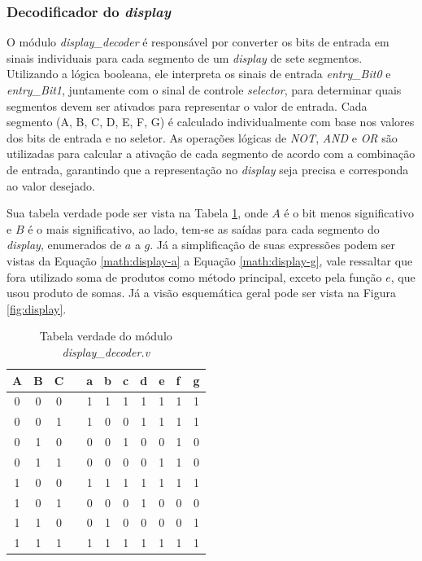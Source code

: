 \documentclass[
	article,			%
	11pt,				%
	oneside,			%
	a4paper,			%
	english,			%
	brazil,				%
	sumario=tradicional
	]{abntex2}
\begin{document}
\subsubsection{Decodificador do \textit{display}}
O módulo \textit{display\_decoder} é responsável por converter os bits de entrada em sinais individuais para cada segmento de um \textit{display} de sete segmentos. Utilizando a lógica booleana, ele interpreta os sinais de entrada \textit{entry\_Bit0} e \textit{entry\_Bit1}, juntamente com o sinal de controle \textit{selector}, para determinar quais segmentos devem ser ativados para representar o valor de entrada. Cada segmento (A, B, C, D, E, F, G) é calculado individualmente com base nos valores dos bits de entrada e no seletor. As operações lógicas de \textit{NOT}, \textit{AND} e \textit{OR} são utilizadas para calcular a ativação de cada segmento de acordo com a combinação de entrada, garantindo que a representação no \textit{display} seja precisa e corresponda ao valor desejado. 

Sua tabela verdade pode ser vista na Tabela \ref{tab:display-decoder}, onde $A$ é o bit menos significativo e $B$ é o mais significativo, ao lado, tem-se as saídas para cada segmento do \textit{display}, enumerados de $a$ a $g$. Já a simplificação de suas expressões podem ser vistas da Equação \eqref{math:display-a} a Equação \eqref{math:display-g}, vale ressaltar que fora utilizado soma de produtos como método principal, exceto pela função $e$, que usou produto de somas. Já a visão esquemática geral pode ser vista na Figura \ref{fig:display}.


\begin{table}[H]
\centering
\begin{tabular}{|c|c|c|c|c|c|c|c|c|c|c|}
\hline
A & B & C &  & a & b & \multicolumn{1}{l|}{c} & \multicolumn{1}{l|}{d} & \multicolumn{1}{l|}{e} & \multicolumn{1}{l|}{f} & \multicolumn{1}{l|}{g} \\ \hline
0 & 0 & 0 &  & 1 & 1 & 1 & 1 & 1 & 1 & 1 \\ \hline
0 & 0 & 1 &  & 1 & 0 & 0 & 1 & 1 & 1 & 1 \\ \hline
0 & 1 & 0 &  & 0 & 0 & 1 & 0 & 0 & 1 & 0 \\ \hline
0 & 1 & 1 &  & 0 & 0 & 0 & 0 & 1 & 1 & 0 \\ \hline
1 & 0 & 0 &  & 1 & 1 & 1 & 1 & 1 & 1 & 1 \\ \hline
1 & 0 & 1 &  & 0 & 0 & 0 & 1 & 0 & 0 & 0 \\ \hline
1 & 1 & 0 &  & 0 & 1 & 0 & 0 & 0 & 0 & 1 \\ \hline
1 & 1 & 1 &  & 1 & 1 & 1 & 1 & 1 & 1 & 1 \\ \hline
\end{tabular}
\caption{Tabela verdade do módulo \textit{display\_decoder.v}}
\label{tab:display-decoder}
\end{table}
\end{document}
